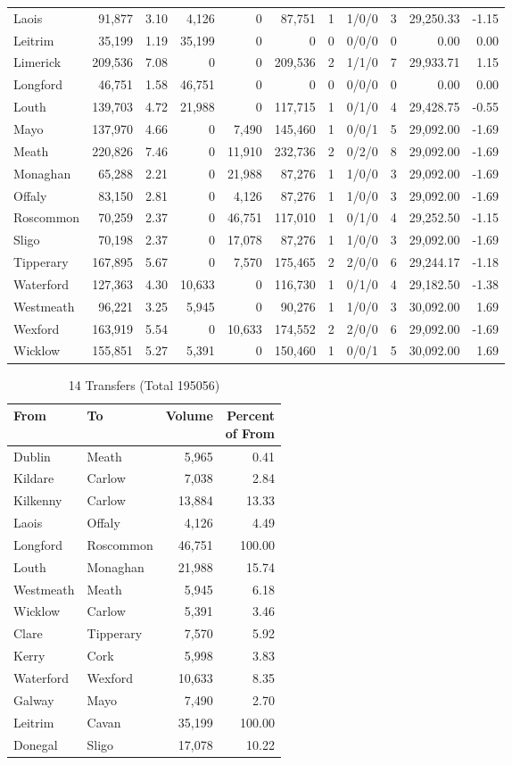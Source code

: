 \documentclass[a4paper]{article}
\begin{document}
\begin{longtable}{lrrrrrrlrrr}
Laois&91,877& 3.10&4,126&0&87,751&1&1/0/0&3&29,250.33&-1.15\\ 
Leitrim&35,199& 1.19&35,199&0&0&0&0/0/0&0& 0.00& 0.00\\ 
Limerick&209,536& 7.08&0&0&209,536&2&1/1/0&7&29,933.71& 1.15\\ 
Longford&46,751& 1.58&46,751&0&0&0&0/0/0&0& 0.00& 0.00\\ 
Louth&139,703& 4.72&21,988&0&117,715&1&0/1/0&4&29,428.75&-0.55\\ 
Mayo&137,970& 4.66&0&7,490&145,460&1&0/0/1&5&29,092.00&-1.69\\ 
Meath&220,826& 7.46&0&11,910&232,736&2&0/2/0&8&29,092.00&-1.69\\ 
Monaghan&65,288& 2.21&0&21,988&87,276&1&1/0/0&3&29,092.00&-1.69\\ 
Offaly&83,150& 2.81&0&4,126&87,276&1&1/0/0&3&29,092.00&-1.69\\ 
Roscommon&70,259& 2.37&0&46,751&117,010&1&0/1/0&4&29,252.50&-1.15\\ 
Sligo&70,198& 2.37&0&17,078&87,276&1&1/0/0&3&29,092.00&-1.69\\ 
Tipperary&167,895& 5.67&0&7,570&175,465&2&2/0/0&6&29,244.17&-1.18\\ 
Waterford&127,363& 4.30&10,633&0&116,730&1&0/1/0&4&29,182.50&-1.38\\ 
Westmeath&96,221& 3.25&5,945&0&90,276&1&1/0/0&3&30,092.00& 1.69\\ 
Wexford&163,919& 5.54&0&10,633&174,552&2&2/0/0&6&29,092.00&-1.69\\ 
Wicklow&155,851& 5.27&5,391&0&150,460&1&0/0/1&5&30,092.00& 1.69\\ 
\end{longtable}

\begin{table}[htbp]
\caption{14 Transfers (Total 195056)}
\centering
\begin{tabular}{llrr} \toprule
From &To &Volume &\shortstack{Percent\\of From} \\ \midrule
Dublin&Meath&5,965& 0.41\\ 
Kildare&Carlow&7,038& 2.84\\ 
Kilkenny&Carlow&13,884&13.33\\ 
Laois&Offaly&4,126& 4.49\\ 
Longford&Roscommon&46,751&100.00\\ 
Louth&Monaghan&21,988&15.74\\ 
Westmeath&Meath&5,945& 6.18\\ 
Wicklow&Carlow&5,391& 3.46\\ 
Clare&Tipperary&7,570& 5.92\\ 
Kerry&Cork&5,998& 3.83\\ 
Waterford&Wexford&10,633& 8.35\\ 
Galway&Mayo&7,490& 2.70\\ 
Leitrim&Cavan&35,199&100.00\\ 
Donegal&Sligo&17,078&10.22\\ 
\bottomrule
\end{tabular}
\end{table}
\end{document}
